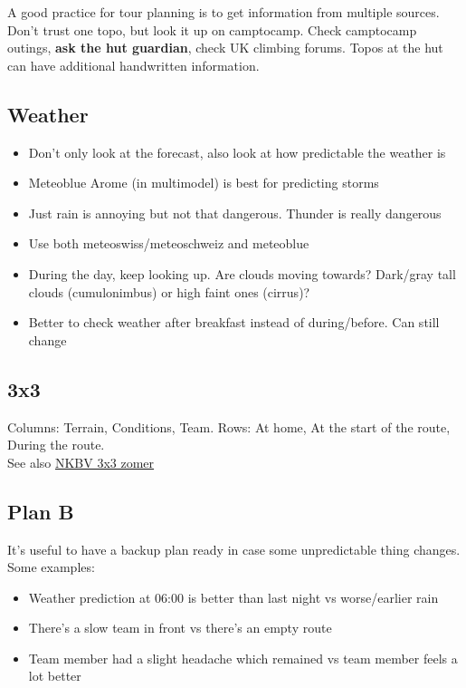 A good practice for tour planning is to get information from multiple sources. Don't trust one topo, but look it up on camptocamp. Check camptocamp outings, \textbf{ask the hut guardian}, check UK climbing forums. Topos at the hut can have additional handwritten information.
\subsection{Weather}
\begin{itemize}
\item Don't only look at the forecast, also look at how predictable the weather is
\item Meteoblue Arome (in multimodel) is best for predicting storms
\item Just rain is annoying but not that dangerous. Thunder is really dangerous
\item Use both meteoswiss/meteoschweiz and meteoblue
\item During the day, keep looking up. Are clouds moving towards? Dark/gray tall clouds (cumulonimbus) or high faint ones (cirrus)?
\item Better to check weather after breakfast instead of during/before. Can still change
\end{itemize}

\subsection{3x3}
Columns: Terrain, Conditions, Team. Rows: At home, At the start of the route, During the route.\\
See also \href{https://nkbv.nl/kenniscentrum/3-x-3-zomer-risicomanagement-in-alpien-terrein.html}{NKBV 3x3 zomer}

\subsection{Plan B}
It's useful to have a backup plan ready in case some unpredictable thing changes. Some examples:
\begin{itemize}
\item Weather prediction at 06:00 is better than last night vs worse/earlier rain
\item There's a slow team in front vs there's an empty route
\item Team member had a slight headache which remained vs team member feels a lot better
\end{itemize}

